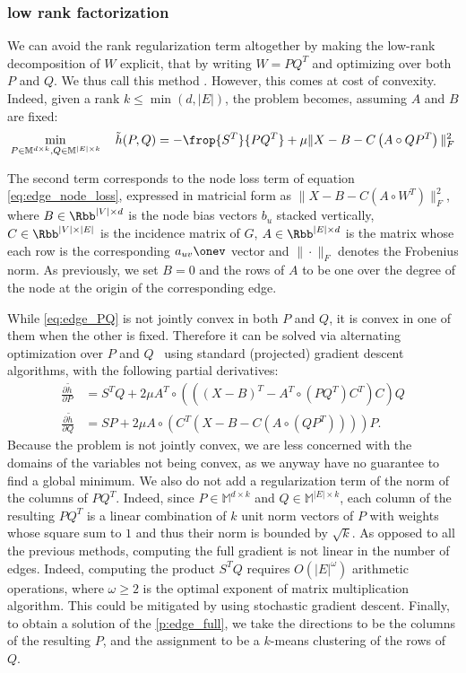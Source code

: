 \subsubsection{\pqt{} low rank factorization}

We can avoid the rank regularization term altogether by making the low-rank decomposition of $W$
explicit, that by writing $W=PQ^T$ and optimizing over both $P$ and $Q$. We thus call this method
\pqt{}. However, this comes at cost
of convexity. Indeed, given a rank $k\leq \min(d,|E|)$, the problem becomes, assuming $A$ and $B$
are fixed:
\begin{equation}
  \label{eq:edge_PQ}
  \min_{P\in\mathbb{M}^{d\times k}, Q\in\mathbb{M}^{|E|\times k}} \quad \tilde{h}(P, Q) =
  - \frop{S^T}{PQ^T} + \mu \|X - B - C\left(A\circ QP^T \right)\|_F^2
\end{equation}

The second term corresponds to the node loss term of equation \eqref{eq:edge_node_loss}, expressed
in matricial form as $\|X - B -
C\left(A\circ W^T \right)\|_F^2$, where $B\in \Rbb^{|V| \times d}$ is the node bias vectors $b_u$
stacked vertically, $C \in \Rbb^{|V| \times |E|}$ is the incidence matrix of $G$, $A \in \Rbb^{|E|
\times d}$ is the matrix whose each row is the corresponding $a_{uv}\onev$ vector and $\|\cdot\|_F$
denotes the Frobenius norm. As previously, we set $B=0$ and the rows of $A$ to be one over the
degree of the node at the origin of the corresponding edge.

While \eqref{eq:edge_PQ} is not jointly convex in both $P$ and $Q$, it is convex in one of
them when the other is fixed. Therefore it can be solved via alternating optimization over $P$ and
$Q$~\autocite{AlternatingOptim02} using standard (projected) gradient descent algorithms, with the
following partial derivatives:
\begin{align*}
  \frac{\partial \tilde{h}}{\partial P} &=
  S^T Q + 2\mu
  A^T \circ (((X-B)^T -A^T \circ (PQ^T )C^T )C)Q 
  \\
  \frac{\partial \tilde{h}}{\partial Q} &=
  S P + 2\mu
  A\circ (C^T (X-B-C(A\circ (QP^T ))))P.
\end{align*}
Because the problem is not jointly convex, we are less concerned with the domains of the variables
not being convex, as we anyway have no guarantee to find a global minimum. We also do not add a
regularization term of the norm of the columns of $PQ^T$. Indeed, since $P\in\mathbb{M}^{d\times k}$
and $Q\in\mathbb{M}^{|E|\times k}$, each column of the resulting $PQ^T$ is a linear combination of
$k$ unit norm vectors of $P$ with weights whose square sum to $1$ and thus their norm is bounded by
$\sqrt{k}$. As opposed to all the previous methods, computing the full gradient is not linear in the
number of edges. Indeed, computing the product $S^T Q$ requires $O(|E|^\omega)$ arithmetic
operations, where $\omega \geq 2$ is the optimal exponent of matrix multiplication
algorithm. This could be mitigated by using stochastic gradient descent. Finally, to obtain a
solution of the \ecp{} \autoref{p:edge_full}, we take the directions to be the columns of the
resulting $P$, and the assignment to be a $k$-means clustering of the rows of $Q$.


